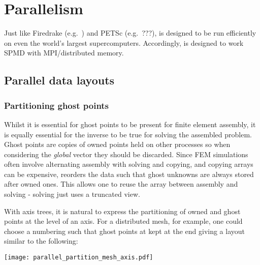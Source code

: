 \documentclass[thesis]{subfiles}
\begin{document}
\chapter{Parallelism}
\label{chapter:parallel}

Just like Firedrake (e.g.~\cite{betteridgeCodeGenerationProductive2021}) and PETSc (e.g.~???),  is designed to be run efficiently on even the world's largest supercomputers.
Accordingly,  is designed to work SPMD with MPI/distributed memory.

\section{Parallel data layouts}
\label{sec:parallel_data_layouts}


\subsection{Partitioning ghost points}

Whilst it is essential for ghost points to be present for finite element assembly, it is equally essential for the inverse to be true for solving the assembled problem.
Ghost points are copies of owned points held on other processes so when considering the \textit{global} vector they should be discarded.
Since FEM simulations often involve alternating assembly with solving and copying, and copying arrays can be expensive,  reorders the data such that ghost unknowns are always stored after owned ones.
This allows one to reuse the array between assembly and solving - solving just uses a truncated view.

With axis trees, it is natural to express the partitioning of owned and ghost points at the level of an axis.
For a distributed mesh, for example, one could choose a numbering such that ghost points at kept at the end giving a layout similar to the following:

\begin{center}
  \texttt{[image: parallel\_partition\_mesh\_axis.pdf]}
\end{center}
\end{document}
